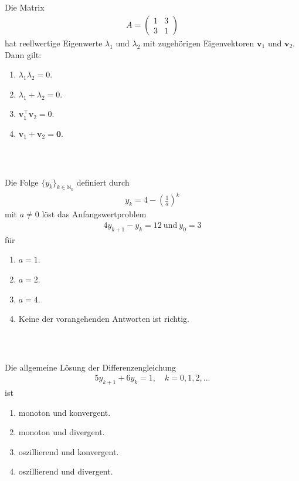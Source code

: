 \newpage
\subsection*{}
Die Matrix
\begin{align*}
A 
= 
\begin{pmatrix}
1 & 3 \\
3 & 1
\end{pmatrix}
\end{align*}
hat reellwertige Eigenwerte $\lambda_1$ und $\lambda_2$
mit zugehörigen Eigenvektoren $\textbf{v}_1$ und $\textbf{v}_2$.
Dann gilt:
\renewcommand{\labelenumi}{(\alph{enumi})}
\begin{enumerate}
\item 
$\lambda_1 \lambda_2 = 0$.
\item
$\lambda_1 +  \lambda_2 = 0$.
\item
$\textbf{v}_1^\top \textbf{v}_2  = 0 $.
\item
$\textbf{v}_1 +  \textbf{v}_2  = \textbf{0} $.
\end{enumerate}
\ \\
\subsection*{}
Die Folge $\lbrace y_k \rbrace_{k \in \mathbb{N}_0}$ definiert durch
\begin{align*}
y_k =  4 - \left( \frac{1}{a}\right)^k
\end{align*}
mit $a \neq 0$ löst das Anfangswertproblem
\begin{align*}
4 y_{k+1} -y_k = 12 \ \text{und} \ y_0 = 3
\end{align*}
für
\renewcommand{\labelenumi}{(\alph{enumi})}
\begin{enumerate}
\item 
$a= 1$.
\item
$a= 2$.
\item
$a= 4$.
\item
Keine der vorangehenden Antworten ist richtig.
\end{enumerate}
\ \\
\subsection*{}
Die allgemeine Lösung der Differenzengleichung
\begin{align*}
5 y_{k+1} + 6 y_k = 1 , \quad k = 0,1,2,...
\end{align*}
ist
\renewcommand{\labelenumi}{(\alph{enumi})}
\begin{enumerate}
\item 
monoton und konvergent.
\item
monoton und divergent.
\item
oszillierend und konvergent.
\item
oszillierend und divergent.
\end{enumerate}
\ \\
